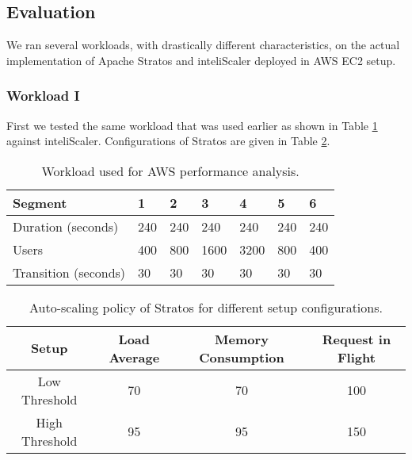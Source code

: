 \subsection{Evaluation}

We ran several workloads, with drastically different characteristics, on the actual implementation of Apache Stratos and inteliScaler deployed in AWS EC2 setup.

\subsubsection{Workload I}
First we tested the same workload that was used earlier as shown in Table \ref{table:analysis_workload} against inteliScaler. Configurations of Stratos are given in Table \ref{table:policy_threshold}.

\begin{table}[h!]
\centering
\caption{Workload used for AWS performance analysis.}
\label{table:analysis_workload}
\begin{tabular}{|l|l|l|l|l|l|l|}
\hline
Segment & 1 & 2 & 3 & 4 & 5 & 6\\ \hline
Duration (seconds) & 240 & 240 & 240 & 240 & 240 & 240 \\ \hline
Users & 400 & 800 & 1600 & 3200 & 800 & 400   \\ \hline
Transition (seconds) & 30 & 30 & 30 & 30 & 30 & 30 \\ \hline
\end{tabular}
\end{table}

\begin{table}[h!]
\centering
\caption{Auto-scaling policy of Stratos for different setup configurations.}
\label{table:policy_threshold}
\begin{tabular}{|c|c|c|c|}
\hline
Setup & Load Average & Memory Consumption & Request in Flight \\ \hline
Low Threshold & 70 & 70 & 100\\ \hline
High Threshold & 95 & 95 & 150\\ \hline
\end{tabular}
\end{table}
